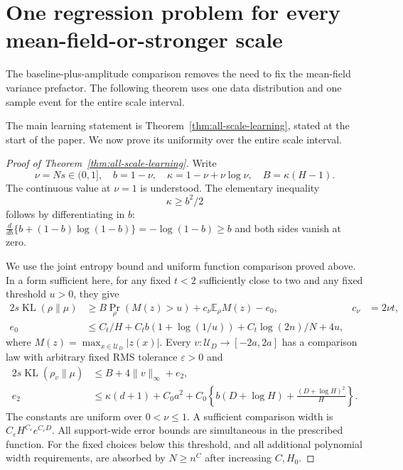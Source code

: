 \section{One regression problem for every mean-field-or-stronger scale}
\label{sec:all-scale-learning}
The baseline-plus-amplitude comparison removes the need to fix the mean-field variance prefactor. The following theorem uses one data distribution and one sample event for the entire scale interval.

The main learning statement is Theorem~\ref{thm:all-scale-learning}, stated at the start of the paper. We now prove its uniformity over the entire scale interval.

\begin{proof}[Proof of Theorem~\ref{thm:all-scale-learning}]
Write
\[
 \nu=Ns\in(0,1],\quad b=1-\nu,\quad
 \kappa=1-\nu+\nu\log\nu,\quad B=\kappa(H-1).
\]
The continuous value at $\nu=1$ is understood. The elementary inequality
\begin{equation}
 \kappa\ge b^2/2
 \label{eq:kappa-quadratic}
\end{equation}
follows by differentiating in $b$: $\frac{d}{db}\{b+(1-b)\log(1-b)\}=-\log(1-b)\ge b$ and both sides vanish at zero.

We use the joint entropy bound and uniform function comparison proved above. In a form sufficient here, for any fixed $t<2$ sufficiently close to two and any fixed threshold $u>0$, they give
\begin{align}
 2s\operatorname{KL}(\rho\|\mu)
 &\ge B\Pr_\rho(M(z)>u)+c_\nu\mathbb E_\rho M(z)-e_0,
 &c_\nu&=2\nu t,\label{eq:allscale-floor}\\
 e_0&\le C_t/H+C_t b(1+\log(1/u))
                  +C_t\log(2n)/N+4u,\label{eq:allscale-floor-error}
\end{align}
where $M(z)=\max_{x\in\mathcal U_D}|z(x)|$. Every $v:\mathcal U_D\to[-2a,2a]$ has a comparison law with arbitrary fixed RMS tolerance $\varepsilon>0$ and
\begin{align}
 2s\operatorname{KL}(\rho_v\|\mu)
 &\le B+4\|v\|_\infty+e_2,\label{eq:allscale-comparison}\\
 e_2&\le\kappa(d+1)+C_0a^2+
 C_0\left\{b(D+\log H)+\frac{(D+\log H)^2}{H}\right\}.
 \label{eq:allscale-comparison-error}
\end{align}
The constants are uniform over $0<\nu\le1$. A sufficient comparison width is $C_\varepsilon H^{C_\varepsilon}e^{C_\varepsilon D}$. All support-wide error bounds are simultaneous in the prescribed function. For the fixed choices below this threshold, and all additional polynomial width requirements, are absorbed by $N\ge n^C$ after increasing $C,H_0$.


\end{proof}
